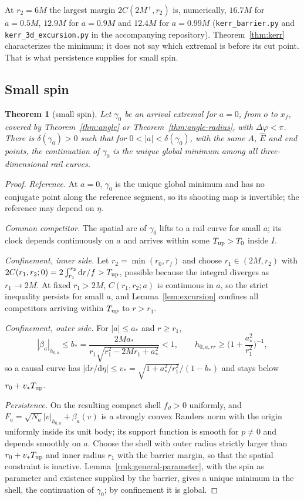 \documentclass[aip,jmp,amsmath,amssymb,reprint]{revtex4-2}
\newcommand{\Ehat}{\hat E}
\newcommand{\dd}{\mathrm{d}}
\theoremstyle{plain}
\newtheorem{theorem}{Theorem}
\theoremstyle{definition}
\begin{document}
At $r_2=6M$ the largest margin $2C(2M^+,r_2)$ is, numerically, $16.7M$ for $a=0.5M$, $12.9M$ for $a=0.9M$
and $12.4M$ for $a=0.99M$ (\texttt{kerr\_barrier.py} and
\texttt{kerr\_3d\_excursion.py} in the accompanying repository). Theorem~\ref{thm:kerr} characterizes the minimum; it does
not say which extremal is before its cut point. That is what persistence supplies for small
spin.

\subsection{Small spin}
\begin{theorem}[small spin]\label{thm:D}
Let $\gamma_0$ be an arrival extremal for $a=0$, from $o$ to $x_f$, covered by
Theorem~\ref{thm:angle} or Theorem~\ref{thm:angle-radius}, with $\Delta\varphi<\pi$. There is $\delta(\gamma_0)>0$ such
that for $0<|a|<\delta(\gamma_0)$, with the same $A$, $\Ehat$ and end points, the continuation of
$\gamma_0$ is the unique global minimum among all three-dimensional rail curves.
\end{theorem}

\begin{proof}
\emph{Reference.} At $a=0$, $\gamma_0$ is the unique global minimum and has no conjugate point
along the reference segment, so its shooting map is invertible; the reference may depend on $\eta$.

\emph{Common competitor.} The spatial arc of $\gamma_0$ lifts to a rail curve for small $a$; its
clock depends continuously on $a$ and arrives within some $T_{\rm up}>T_0$ inside $I$.

\emph{Confinement, inner side.} Let $r_2=\min(r_0,r_f)$ and choose $r_1\in(2M,r_2)$ with
$2C(r_1,r_2;0)=2\int_{r_1}^{r_2}\dd r/f>T_{\rm up}$, possible because the integral diverges as
$r_1\to2M$. At fixed $r_1>2M$, $C(r_1,r_2;a)$ is continuous in $a$, so the strict inequality
persists for small $a$, and Lemma~\ref{lem:excursion} confines all competitors arriving
within $T_{\rm up}$ to $r>r_1$.

\emph{Confinement, outer side.} For $|a|\le a_*$ and $r\ge r_1$,
\[
  |\beta_a|_{h_{0,a}}\le b_*=\frac{2Ma_*}{r_1\sqrt{r_1^2-2Mr_1+a_*^2}}<1,\qquad
  h_{0,a,rr}\ge\Big(1+\frac{a_*^2}{r_1^2}\Big)^{-1},
\]
so a causal curve has
$|\dd r/\dd\eta|\le v_*=\sqrt{1+a_*^2/r_1^2}/(1-b_*)$ and stays below $r_0+v_*T_{\rm up}$.

\emph{Persistence.} On the resulting compact shell $f_\vartheta>0$ uniformly, and
$F_a=\sqrt{N_a}|v|_{h_{0,a}}+\beta_a(v)$ is a strongly convex Randers norm with the origin
uniformly inside its unit body; its support function is smooth for $p\neq0$ and depends
smoothly on $a$. Choose the shell with outer radius strictly larger than
$r_0+v_*T_{\rm up}$ and inner radius $r_1$ with the barrier margin, so that the spatial
constraint is inactive. Lemma~\ref{rmk:general-parameter}, with the spin as parameter and
existence supplied by the barrier, gives a unique minimum in the shell, the continuation of
$\gamma_0$; by confinement it is global.
\end{proof}
\end{document}
